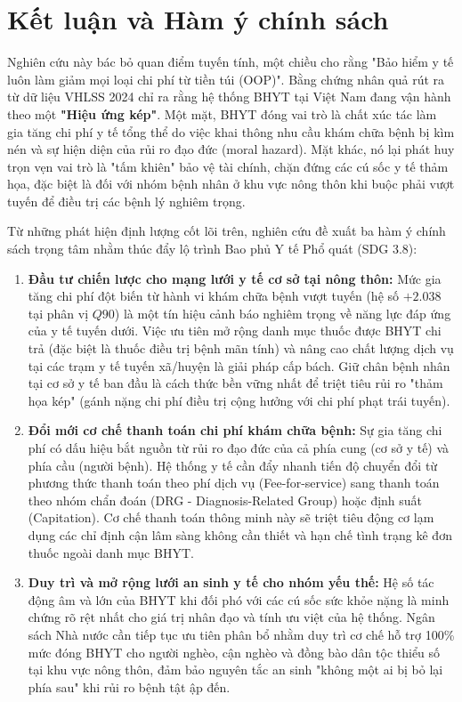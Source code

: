 \documentclass[12pt,a4paper]{article}
\begin{document}
\section{Kết luận và Hàm ý chính sách}

Nghiên cứu này bác bỏ quan điểm tuyến tính, một chiều cho rằng "Bảo hiểm y tế luôn làm giảm mọi loại chi phí từ tiền túi (OOP)". Bằng chứng nhân quả rút ra từ dữ liệu VHLSS 2024 chỉ ra rằng hệ thống BHYT tại Việt Nam đang vận hành theo một \textbf{"Hiệu ứng kép"}. Một mặt, BHYT đóng vai trò là chất xúc tác làm gia tăng chi phí y tế tổng thể do việc khai thông nhu cầu khám chữa bệnh bị kìm nén và sự hiện diện của rủi ro đạo đức (moral hazard). Mặt khác, nó lại phát huy trọn vẹn vai trò là "tấm khiên" bảo vệ tài chính, chặn đứng các cú sốc y tế thảm họa, đặc biệt là đối với nhóm bệnh nhân ở khu vực nông thôn khi buộc phải vượt tuyến để điều trị các bệnh lý nghiêm trọng.

Từ những phát hiện định lượng cốt lõi trên, nghiên cứu đề xuất ba hàm ý chính sách trọng tâm nhằm thúc đẩy lộ trình Bao phủ Y tế Phổ quát (SDG 3.8):

\begin{enumerate}
	\item \textbf{Đầu tư chiến lược cho mạng lưới y tế cơ sở tại nông thôn:} Mức gia tăng chi phí đột biến từ hành vi khám chữa bệnh vượt tuyến (hệ số $+2.038$ tại phân vị $Q90$) là một tín hiệu cảnh báo nghiêm trọng về năng lực đáp ứng của y tế tuyến dưới. Việc ưu tiên mở rộng danh mục thuốc được BHYT chi trả (đặc biệt là thuốc điều trị bệnh mãn tính) và nâng cao chất lượng dịch vụ tại các trạm y tế tuyến xã/huyện là giải pháp cấp bách. Giữ chân bệnh nhân tại cơ sở y tế ban đầu là cách thức bền vững nhất để triệt tiêu rủi ro "thảm họa kép" (gánh nặng chi phí điều trị cộng hưởng với chi phí phạt trái tuyến).
	
	\item \textbf{Đổi mới cơ chế thanh toán chi phí khám chữa bệnh:} Sự gia tăng chi phí có dấu hiệu bắt nguồn từ rủi ro đạo đức của cả phía cung (cơ sở y tế) và phía cầu (người bệnh). Hệ thống y tế cần đẩy nhanh tiến độ chuyển đổi từ phương thức thanh toán theo phí dịch vụ (Fee-for-service) sang thanh toán theo nhóm chẩn đoán (DRG - Diagnosis-Related Group) hoặc định suất (Capitation). Cơ chế thanh toán thông minh này sẽ triệt tiêu động cơ lạm dụng các chỉ định cận lâm sàng không cần thiết và hạn chế tình trạng kê đơn thuốc ngoài danh mục BHYT.
	
	\item \textbf{Duy trì và mở rộng lưới an sinh y tế cho nhóm yếu thế:} Hệ số tác động âm và lớn của BHYT khi đối phó với các cú sốc sức khỏe nặng là minh chứng rõ rệt nhất cho giá trị nhân đạo và tính ưu việt của hệ thống. Ngân sách Nhà nước cần tiếp tục ưu tiên phân bổ nhằm duy trì cơ chế hỗ trợ 100\% mức đóng BHYT cho người nghèo, cận nghèo và đồng bào dân tộc thiểu số tại khu vực nông thôn, đảm bảo nguyên tắc an sinh "không một ai bị bỏ lại phía sau" khi rủi ro bệnh tật ập đến.
\end{enumerate}
\end{document}
